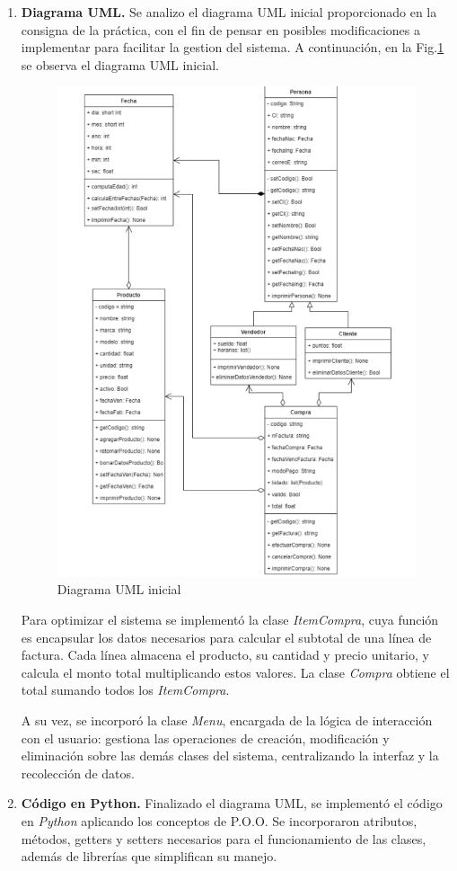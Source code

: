 \documentclass[11pt]{article}
\begin{document}
\begin{enumerate}
    \item 
\textbf{Diagrama UML.} Se analizo el diagrama UML inicial proporcionado en la consigna de la práctica, con el fin de pensar en posibles modificaciones a implementar para facilitar la gestion del sistema. A continuación, en la Fig.\ref{fig:umlinicial} se observa el diagrama UML inicial.

\begin{figure}[H]
    \centering
    \includegraphics[width=0.5\linewidth]{./anexos/UML INICIAL.png}
    \caption{Diagrama UML inicial}
    \label{fig:umlinicial}
\end{figure}

Para optimizar el sistema se implementó la clase \textit{ItemCompra}, cuya función es encapsular los datos necesarios para calcular el subtotal de una línea de factura. Cada línea almacena el producto, su cantidad y precio unitario, y calcula el monto total multiplicando estos valores. La clase \textit{Compra} obtiene el total sumando todos los \textit{ItemCompra}.  

A su vez, se incorporó la clase \textit{Menu}, encargada de la lógica de interacción con el usuario: gestiona las operaciones de creación, modificación y eliminación sobre las demás clases del sistema, centralizando la interfaz y la recolección de datos.


\item 
\textbf{Código en Python.} Finalizado el diagrama UML, se implementó el código en \textit{Python} aplicando los conceptos de P.O.O. Se incorporaron atributos, métodos, getters y setters necesarios para el funcionamiento de las clases, además de librerías que simplifican su manejo.  


\end{enumerate}
\end{document}
